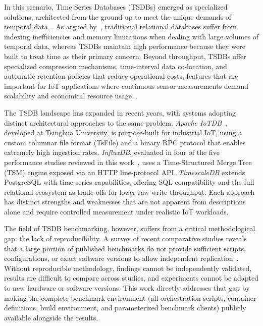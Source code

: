 In this scenario, Time Series Databases (TSDBs) emerged as specialized solutions, architected
from the ground up to meet the unique demands of temporal data~\citep{InfluxDataTimeSeries}.
As argued by~\cite{naqvi2017influxdb}, traditional relational databases suffer from indexing
inefficiencies and memory limitations when dealing with large volumes of temporal data, whereas
TSDBs maintain high performance because they were built to treat time as their primary concern.
Beyond throughput, TSDBs offer specialized compression mechanisms, time-interval data
co-location, and automatic retention policies that reduce operational costs, features that
are important for IoT applications where continuous sensor measurements demand scalability
and economical resource usage~\citep{Dunning2014}.

The TSDB landscape has expanded in recent years, with systems adopting distinct
architectural approaches to the same problem. \textit{Apache IoTDB}~\citep{wang2023iotdb},
developed at Tsinghua University, is purpose-built for industrial IoT, using a custom columnar
file format (TsFile) and a binary RPC protocol that enables extremely high ingestion rates.
\textit{InfluxDB}, evaluated in four of the five performance studies reviewed in this
work~\citep{naqvi2017influxdb,shah2022performance,lima2024avaliando,wang2023iotdb}, uses a
Time-Structured Merge Tree (TSM) engine exposed via an HTTP line-protocol API. \textit{TimescaleDB}
extends PostgreSQL with time-series capabilities, offering SQL compatibility
and the full relational ecosystem as trade-offs for lower raw write throughput. Each approach has
distinct strengths and weaknesses that are not apparent from descriptions alone and require
controlled measurement under realistic IoT workloads.

The field of TSDB benchmarking, however, suffers from a critical methodological gap: the lack of
reproducibility. A survey of recent comparative studies reveals that a large portion of published
benchmarks do not provide sufficient scripts, configurations, or exact software versions to
allow independent replication~\citep{pereira2023mulletbench,shah2022performance,naqvi2017influxdb}.
Without reproducible methodology, findings cannot be independently validated, results are
difficult to compare across studies, and experiments cannot be adapted to new hardware or
software versions. This work directly addresses that gap by making the complete benchmark
environment (all orchestration scripts, container definitions, build environment, and
parameterized benchmark clients) publicly available alongside the results.

